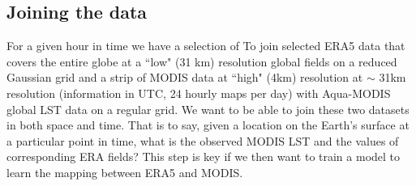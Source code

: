 \documentclass[hess, twostagejnl]{copernicus}
\providecommand{\DIFadd}[1]{{\protect\color{blue} \sf #1}} %
\providecommand{\DIFdel}[1]{{\protect\color{red} \scriptsize #1}} %
\providecommand{\DIFaddbegin}{} %
\providecommand{\DIFaddend}{} %
\providecommand{\DIFdelbegin}{} %
\providecommand{\DIFdelend}{} %
\begin{document}
\DIFaddend 

\subsection{Joining the data}\label{sec:join}
\DIFdelbegin \DIFdel{For a given hour in time we have a selection of }\DIFdelend \DIFaddbegin \DIFadd{To join selected }\DIFaddend ERA5 \DIFdelbegin \DIFdel{data that covers the entire globe at a ``low" (31 km) resolution }\DIFdelend \DIFaddbegin \DIFadd{global fields }\DIFaddend on a reduced Gaussian grid \DIFdelbegin \DIFdel{and a strip of MODIS data at ``high" (4km) resolution }\DIFdelend \DIFaddbegin \DIFadd{at $\sim$ 31km resolution (information in UTC, 24 hourly maps per day) with Aqua-MODIS global LST data }\DIFaddend on a regular \DIFdelbegin \DIFdel{grid. We want to be able to join these two datasets in both space and time. That is to say, given a location on the Earth's surface at a particular point in time, what is the observed MODIS LST and the values of corresponding ERA fields? This step is key if we then want to train a model to learn the mapping between ERA5 and MODIS. }%
\end{document}
